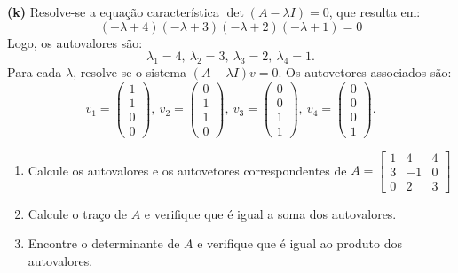 \begin{resolution}
  {\bf (k)} \;
  Resolve-se a equação característica \( \det(A - \lambda I) = 0 \), que resulta em:
  \[
    \left(-\lambda+4\right)\left(-\lambda+3\right)\left(-\lambda+2\right)\left(-\lambda+1\right)=0
  \]
  Logo, os autovalores são:
  \[
    \lambda_1=4,\:\lambda_2=3,\:\lambda_3=2,\:\lambda_4=1.
  \]
  Para cada \(\lambda\), resolve-se o sistema \((A - \lambda I)v = 0\). Os autovetores associados são:
  \[
    v_1 = \begin{pmatrix}1\\ 1\\ 0\\ 0\end{pmatrix},\:
    v_2 = \begin{pmatrix}0\\ 1\\ 1\\ 0\end{pmatrix},\:
    v_3 = \begin{pmatrix}0\\ 0\\ 1\\ 1\end{pmatrix},\:
    v_4 = \begin{pmatrix}0\\ 0\\ 0\\ 1\end{pmatrix}.
  \]
\end{resolution}

\begin{question}
  \vspace{-24pt}
  \begin{enumerate}[label=\alph*)]
    \item Calcule os autovalores e os autovetores correspondentes de $A = \begin{bmatrix}
              1 & 4 & 4 \\ 3 & -1 & 0 \\ 0 & 2 & 3
            \end{bmatrix}$

    \item Calcule o traço de $A$ e verifique que é igual a soma dos autovalores.
    \item Encontre o determinante de $A$ e verifique que é igual ao produto dos autovalores.
  \end{enumerate}
\end{question}

